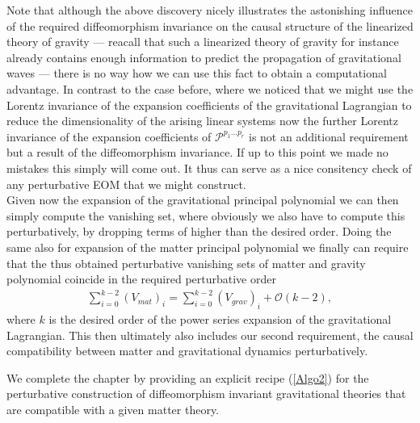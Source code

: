 \documentclass[a4paper,12pt, DIV=14, BCOR=5mm, twoside, headsepline]{scrbook}
\begin{document}
Note that although the above discovery nicely illustrates the astonishing influence of the required diffeomorphism invariance on the causal structure of the linearized theory of gravity --- reacall that such a linearized theory of gravity for instance already contains enough information to predict the propagation of gravitational waves --- there is no way how we can use this fact to obtain a computational advantage. In contrast to the case before, where we noticed that we might use the Lorentz invariance of the expansion coefficients of the gravitational Lagrangian to reduce the dimensionality of the arising linear systems now the further Lorentz invariance of the expansion coefficients of $\mathcal{P}^{p_1...p_r}$ is not an additional requirement but a result of the diffeomorphism invariance. If up to this point we made no mistakes this simply will come out. It thus can serve as a nice consitency check of any perturbative EOM that we might construct.\\

Given now the expansion of the gravitational principal polynomial we can then simply compute the vanishing set, where obviously we also have to compute this perturbatively, by dropping terms of higher than the desired order. Doing the same also for expansion of the matter principal polynomial we finally can require that the thus obtained perturbative vanishing sets of matter and gravity polynomial coincide in the required perturbative order 
\begin{align}
    \sum_{i=0}^{k-2} (V_{mat})_i = \sum _{i=0}^{k-2}(V_{grav})_i + \mathcal{O}(k-2),
\end{align}
where $k$ is the desired order of the power series expansion of the gravitational Lagrangian. This then ultimately also includes our second requirement, the causal compatibility between matter and gravitational dynamics perturbatively. 

We complete the chapter by providing an explicit recipe (\ref{Algo2}) for the perturbative construction of diffeomorphism invariant gravitational theories that are compatible with a given matter theory.\\
\end{document}

